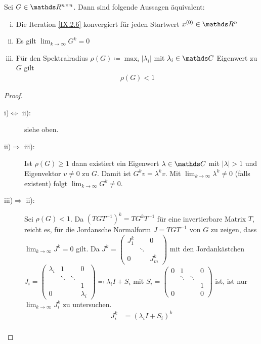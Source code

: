 \begin{Satze}[Konvergenzkriterien]
  Sei $G\in\R^{n\times n}$.
Dann sind folgende Aussagen äquivalent:
\begin{enumerate}[i)]
\item Die Iteration \eqref{IX.2.6} konvergiert für jeden Startwert
  $x^{(0)}\in\R^n$
\item Es gilt $\lim_{k\to\infty}G^k = 0$
\item Für den Spektralradius 
  $\rho(G) \coloneqq \max_i|\lambda_i|$ 
  mit $\lambda_i\in\C$ Eigenwert zu $G$ gilt
  \begin{gather}
    \rho(G) < 1
    \label{IX.2.8}
  \end{gather}
\end{enumerate}

\begin{proof}
  \begin{description}
  \item[i)$\Leftrightarrow$ ii):] siehe oben.
  \item[ii)$\Rightarrow$ iii):]  Ist $\rho(G)\geq 1$ dann 
existiert ein Eigenwert $\lambda\in\C$ mit $|\lambda|>1$ und
Eigenvektor $v\neq 0$ zu $G$.
Damit ist $G^kv=\lambda^kv$. 
Mit $\lim_{k\to\infty}\lambda^k\neq 0$ (falls existent) folgt
$\lim_{k\to\infty}G^k \neq 0$.
\item[iii)$\Rightarrow$ ii):] Sei $\rho(G)<1$.
  Da $\left(TGT^{-1}\right)^k = TG^kT^{-1}$
 für eine invertierbare Matrix $T$, reicht es,
für die Jordansche Normalform $J=TGT^{-1}$ von $G$ zu zeigen,
dass $\lim_{k\to\infty}J^k=0$ gilt.
Da $ J^k =
\begin{pmatrix}
  J_1^k && 0 \\
  &\ddots \\
  0&& J_m^k
\end{pmatrix}$ mit den Jordankästchen
$J_i =
\begin{pmatrix}
  \lambda_i & 1 && 0\\
  &\ddots&\ddots\\
  &&&1\\
  0&&&\lambda_i
\end{pmatrix} \eqqcolon \lambda_iI+S_i$
mit $S_i =
\begin{pmatrix}
  0&1&&0 \\
  &\ddots&\ddots\\
  &&&1\\
  0&&&0
\end{pmatrix}$ ist, ist nur $\lim_{k\to\infty}J_i^k$ zu untersuchen.
\begin{align*}
  J_i^k &= (\lambda_i I+S_i)^k \\

\end{align*}
\end{description}
\end{proof}
\end{Satze}
